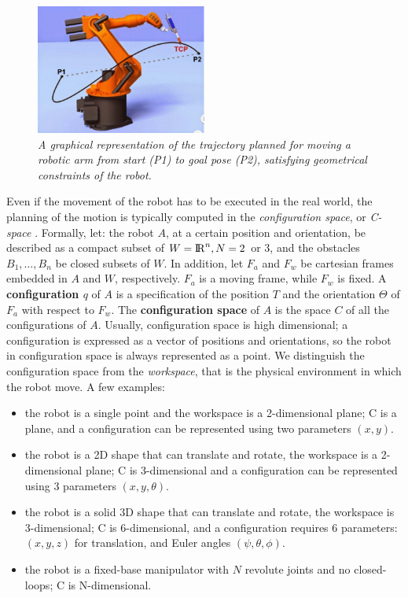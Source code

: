 \begin{figure}
	\centering
	\includegraphics[width=0.5\textwidth]{Images/background_and_tools/motionPlanningArm.png}
	\caption{\textit{A graphical representation of the trajectory planned for moving a robotic arm from start (P1) to goal pose (P2), satisfying geometrical constraints of the robot.}}
	\label{fig:motionPlanningArm}
\end{figure}

Even if the movement of the robot has to be executed in the real world, the planning of the motion is typically computed in the \textit{configuration space}, or \textit{C-space} \parencite{configurationSpace}. Formally, let: the robot $A$, at a certain position and orientation, be described as a compact subset of $W = {\rm I\!R}^n, N=2$ or $3$, and the obstacles $B_1,\dots,B_n$ be closed subsets of $W$. In addition, let $F_a$ and $F_w$ be cartesian frames embedded in $A$ and $W$, respectively. $F_a$ is a moving frame, while $F_w$ is fixed.  
A \textbf{configuration $q$} of  $A$ is a specification of the position $T$ and the orientation $\Theta$ of $F_a$ with respect to $F_w$. The \textbf{configuration space} of $A$ is the space $C$ of all the configurations of $A$.
Usually, configuration space is high dimensional; a configuration is expressed as a vector of positions and orientations, so the robot in configuration space is always represented as a point. We distinguish the configuration space from the \textit{workspace}, that is the physical environment in which the robot move. A few examples:
\begin{itemize}
	\item the robot is a single point and the workspace is a 2-dimensional plane; C is a plane, and a configuration can be represented using two parameters $(x, y)$.
	\item the robot is a 2D shape that can translate and rotate, the workspace is a 2-dimensional plane; C is 3-dimensional and a configuration can be represented using 3 parameters $(x, y, \theta)$.
	\item the robot is a solid 3D shape that can translate and rotate, the workspace is 3-dimensional; C is 6-dimensional, and a configuration requires 6 parameters: $(x, y, z)$ for translation, and Euler angles $(\psi, \theta, \phi)$.
	\item the robot is a fixed-base manipulator with $N$ revolute joints and no closed-loops; C is N-dimensional.
\end{itemize}

